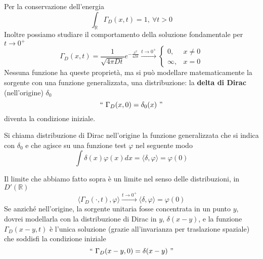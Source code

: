 \documentclass[10pt,a4paper,twoside,openright]{book}
\begin{document}
Per la conservazione dell'energia
\begin{equation*}
\int _{\mathbb{R}} \Gamma _{D}(x,t) =1,\ \forall t >0
\end{equation*}
Inoltre possiamo studiare il comportamento della soluzione fondamentale per $\displaystyle t\rightarrow 0^{+}$
\begin{equation*}
\Gamma _{D}(x,t) =\frac{1}{\sqrt{4\pi Dt}} e^{-\frac{x^{2}}{4Dt}}\xrightarrow{t\rightarrow 0^{+}}\begin{cases}
0, & x\neq 0\\
\infty, & x=0
\end{cases}
\end{equation*}
Nessuna funzione ha queste proprietà, ma si può modellare matematicamente la sorgente con una funzione generalizzata, una distribuzione: la \textbf{delta di Dirac }(nell'origine) $\displaystyle \delta _{0}$
\begin{equation*}
``\ \Gamma _{D}(x,0) =\delta _{0}(x) \ "
\end{equation*}
diventa la condizione iniziale.
\begin{definition}
 Si chiama distribuzione di Dirac nell'origine la funzione generalizzata che si indica con $\displaystyle \delta _{0}$ e che agisce su una funzione test $\displaystyle \varphi $ nel seguente modo
\begin{equation*}
\int \delta (x) \varphi (x) dx=\langle \delta,\varphi \rangle =\varphi (0)
\end{equation*}
\end{definition}
Il limite che abbiamo fatto sopra è un limite nel senso delle distribuzioni, in $\displaystyle D'(\mathbb{R})$
\begin{equation*}
\langle \Gamma _{D}(\cdotp,t),\varphi \rangle \xrightarrow{t\rightarrow 0^{+}} \langle \delta,\varphi \rangle =\varphi (0)
\end{equation*}
Se anziché nell'origine, la sorgente unitaria fosse concentrata in un punto $\displaystyle y$, dovrei modellarla con la distribuzione di Dirac in $\displaystyle y$, $\displaystyle \delta (x-y)$, e la funzione $\displaystyle \Gamma _{D}(x-y,t)$ è l'unica soluzione (grazie all'invarianza per traslazione spaziale) che soddisfi la condizione iniziale 
\begin{equation*}
``\ \Gamma _{D}(x-y,0) =\delta (x-y)\ "
\end{equation*}
\end{document}
